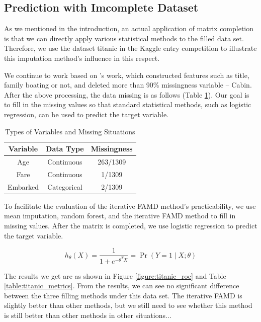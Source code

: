 \documentclass[a4paper,12pt,authoryear]{elegantpaper}
\begin{document}
    \subsection{Prediction with Imcomplete Dataset}

    As we mentioned in the introduction, an actual application of matrix completion is that we can directly apply various statistical methods to the filled data set. Therefore, we use the dataset titanic in the Kaggle entry competition \citep{kaggle_titanic_2015} to illustrate this imputation method's influence in this respect.

    We continue to work based on \citet{hilla_titanic_2017}'s work, which constructed features such as title, family boating or not, and deleted more than 90\% missingness variable -- Cabin. After the above processing, the data missing is as follows (Table \ref{table:tianic_variables}). Our goal is to fill in the missing values so that standard statistical methods, such as logistic regression, can be used to predict the target variable.

    \begin{table}[!hbt]
        \centering
        \caption{Types of Variables and Missing Situations}
        \label{table:tianic_variables}
        \begin{tabular}{@{}ccc@{}}
        \toprule
        Variable & Data Type   & Missingness \\ \midrule
        Age      & Continuous  & 263/1309    \\
        Fare     & Continuous  & 1/1309      \\
        Embarked & Categorical & 2/1309      \\ \bottomrule
        \end{tabular}
    \end{table}

    To facilitate the evaluation of the iterative FAMD method's practicability, we use mean imputation, random forest, and the iterative FAMD method to fill in missing values. After the matrix is completed, we use logistic regression to predict the target variable.

    \begin{equation*}
        h_{\theta}(X)=\frac{1}{1+e^{-\theta^{T} X}}=\operatorname{Pr}(Y=1 \mid X ; \theta)
    \end{equation*}

    The results we get are as shown in Figure \ref{figure:titanic_roc} and Table \ref{table:titanic_metrics}. From the results, we can see no significant difference between the three filling methods under this data set. The iterative FAMD is slightly better than other methods, but we still need to see whether this method is still better than other methods in other situations...
\end{document}

